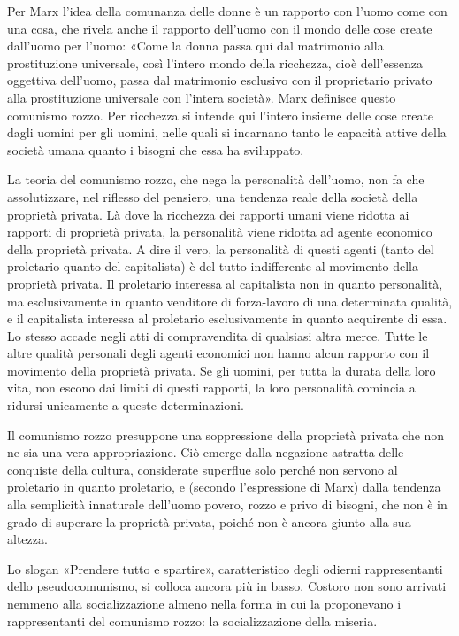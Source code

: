 \documentclass[12pt,a4paper,openany]{book}
\begin{document}
Per Marx l'idea della comunanza delle donne è un rapporto con l'uomo come con una cosa, che rivela anche il rapporto dell'uomo con il mondo delle cose create dall'uomo per l'uomo: «Come la donna passa qui dal matrimonio alla prostituzione universale, così l'intero mondo della ricchezza, cioè dell'essenza oggettiva dell'uomo, passa dal matrimonio esclusivo con il proprietario privato alla prostituzione universale con l'intera società». Marx definisce questo comunismo rozzo. Per ricchezza si intende qui l'intero insieme delle cose create dagli uomini per gli uomini, nelle quali si incarnano tanto le capacità attive della società umana quanto i bisogni che essa ha sviluppato.

La teoria del comunismo rozzo, che nega la personalità dell'uomo, non fa che assolutizzare, nel riflesso del pensiero, una tendenza reale della società della proprietà privata. Là dove la ricchezza dei rapporti umani viene ridotta ai rapporti di proprietà privata, la personalità viene ridotta ad agente economico della proprietà privata. A dire il vero, la personalità di questi agenti (tanto del proletario quanto del capitalista) è del tutto indifferente al movimento della proprietà privata. Il proletario interessa al capitalista non in quanto personalità, ma esclusivamente in quanto venditore di forza-lavoro di una determinata qualità, e il capitalista interessa al proletario esclusivamente in quanto acquirente di essa. Lo stesso accade negli atti di compravendita di qualsiasi altra merce. Tutte le altre qualità personali degli agenti economici non hanno alcun rapporto con il movimento della proprietà privata. Se gli uomini, per tutta la durata della loro vita, non escono dai limiti di questi rapporti, la loro personalità comincia a ridursi unicamente a queste determinazioni.

Il comunismo rozzo presuppone una soppressione della proprietà privata che non ne sia una vera appropriazione. Ciò emerge dalla negazione astratta delle conquiste della cultura, considerate superflue solo perché non servono al proletario in quanto proletario, e (secondo l'espressione di Marx) dalla tendenza alla semplicità innaturale dell'uomo povero, rozzo e privo di bisogni, che non è in grado di superare la proprietà privata, poiché non è ancora giunto alla sua altezza.

Lo slogan «Prendere tutto e spartire», caratteristico degli odierni rappresentanti dello pseudocomunismo, si colloca ancora più in basso. Costoro non sono arrivati nemmeno alla socializzazione almeno nella forma in cui la proponevano i rappresentanti del comunismo rozzo: la socializzazione della miseria.
\end{document}
